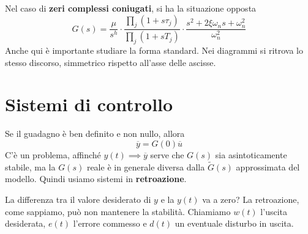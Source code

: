 \begin{figure}[htpb]
\end{figure}
\FloatBarrier

Nel caso di \textbf{zeri complessi coniugati}, si ha la situazione opposta
\begin{equation*}
	G(s) =\frac{\mu }{s^h} \cdot \frac{\prod _j(1+s\tau _j)}{\prod _j(1+sT_j)} \cdot \frac{s^2 +2\xi \omega _n s+\omega ^2_n}{\omega ^2_n}
\end{equation*}
Anche qui è importante studiare la forma standard. Nei diagrammi si ritrova lo stesso discorso, simmetrico rispetto all'asse delle ascisse.

\chapter{Sistemi di controllo}

Se il guadagno è ben definito e non nullo, allora
\begin{equation*}
	\overline{y} =G(0)\overline{u}
\end{equation*}
C'è un problema, affinché $y(t)\implies \overline{y}$ serve che $G(s)$ sia asintoticamente stabile, ma la $G(s)$ reale è in generale diversa dalla $\tilde{G}(s)$ approssimata del modello. Quindi usiamo sistemi in \textbf{retroazione}.

La differenza tra il valore desiderato di $y$ e la $y(t)$ va a zero? La retroazione, come sappiamo, può non mantenere la stabilità. Chiamiamo $w(t)$ l'uscita desiderata, $e(t)$ l'errore commesso e $d(t)$ un eventuale disturbo in uscita.

